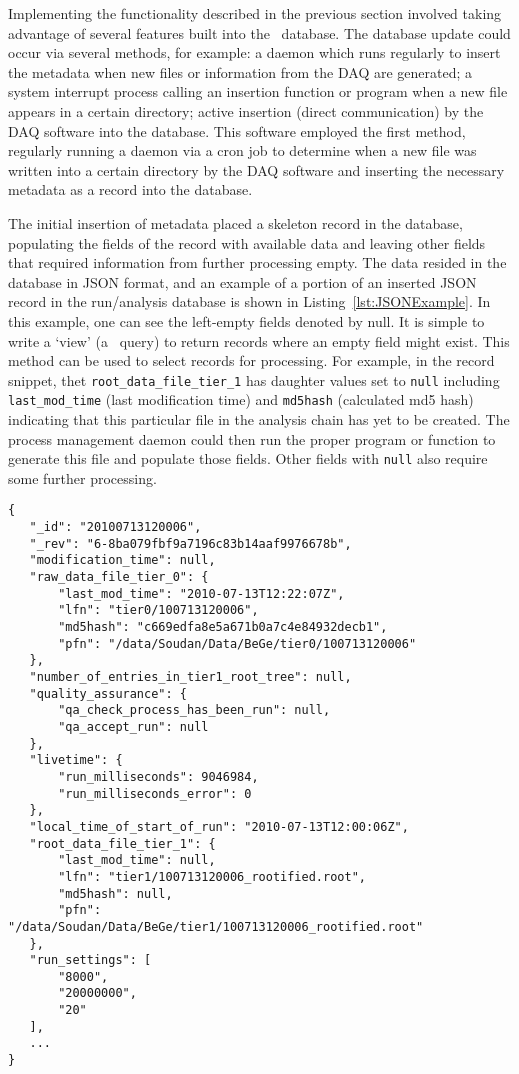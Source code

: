 	Implementing the functionality described in the previous section involved
taking advantage of several features built into the \couchdb~database.  The
database update could occur via several methods, for example: a daemon which
runs regularly to insert the metadata when new files or information from the
DAQ are generated; a system interrupt process calling an insertion function or
program when a new file appears in a certain directory; active insertion
(direct communication) by the DAQ software into the database.  This software
employed the first method, regularly running a daemon via a cron job to
determine when a new file was written into a certain directory by the DAQ
software and inserting the necessary metadata as a record into the database.  
	
	The initial insertion of metadata placed a skeleton record in the database,
populating the fields of the record with available data and leaving other
fields that required information from further processing empty.  The data
resided in the database in JSON format, and an example of a portion of an
inserted JSON record in the run/analysis database is shown in
Listing~\ref{lst:JSONExample}.  In this example, one can see the left-empty
fields denoted by {\ttfamily null}.  It is simple to write a `view' (a \couchdb~query) to return records where an empty field might exist.  This method can be
used to select records for processing.  For example, in the record snippet,
thet \lstinline!root_data_file_tier_1! has daughter values set to
\lstinline!null! including \lstinline!last_mod_time! (last modification time)
and \lstinline!md5hash! (calculated md5 hash) indicating that this particular
file in the analysis chain has yet to be created.  The process management
daemon could then run the proper program or function to generate this file and
populate those fields.  Other fields with \lstinline!null! also require some
further processing.  
	

			\begin{lstlisting}[caption=Truncated example of a JSON record in the run/analysis database., label=lst:JSONExample]
{
   "_id": "20100713120006",
   "_rev": "6-8ba079fbf9a7196c83b14aaf9976678b",
   "modification_time": null,
   "raw_data_file_tier_0": {
       "last_mod_time": "2010-07-13T12:22:07Z",
       "lfn": "tier0/100713120006",
       "md5hash": "c669edfa8e5a671b0a7c4e84932decb1",
       "pfn": "/data/Soudan/Data/BeGe/tier0/100713120006"
   },
   "number_of_entries_in_tier1_root_tree": null,
   "quality_assurance": {
       "qa_check_process_has_been_run": null,
       "qa_accept_run": null
   },
   "livetime": {
       "run_milliseconds": 9046984,
       "run_milliseconds_error": 0
   },
   "local_time_of_start_of_run": "2010-07-13T12:00:06Z",
   "root_data_file_tier_1": {
       "last_mod_time": null,
       "lfn": "tier1/100713120006_rootified.root",
       "md5hash": null,
       "pfn": "/data/Soudan/Data/BeGe/tier1/100713120006_rootified.root"
   },
   "run_settings": [
       "8000",
       "20000000",
       "20"
   ],
   ...
}
			\end{lstlisting}	

